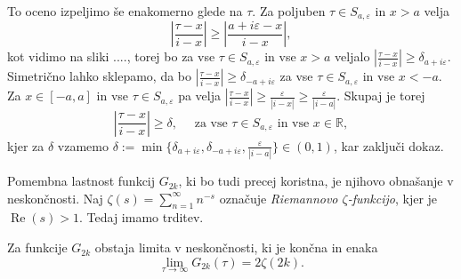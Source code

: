 \documentclass[mat1]{fmfdelo}
\numberwithin{equation}{section}
\newcommand{\R}{\mathbb R}
\newcommand{\abs}[1]{\left\lvert #1 \right\rvert}
\renewcommand\Re{\operatorname{Re}}%
\theoremstyle{definition}
\begin{document}
\begin{dokaz}
    To oceno izpeljimo še enakomerno glede na $\tau$. Za poljuben $\tau \in S_{a, \varepsilon}$ in $x > a$ velja 
    \[
        \abs{\frac{\tau - x}{i - x}} \geq \abs{\frac{a + i\varepsilon - x}{i - x}},
    \]
    kot vidimo na sliki ...., torej bo za vse $\tau \in S_{a, \varepsilon}$ in vse $x > a$
    veljalo $\abs{\tfrac{\tau - x}{i - x}} \geq \delta_{a+i\varepsilon}$. Simetrično lahko sklepamo, da bo $\abs{\tfrac{\tau - x}{i - x}} \geq \delta_{-a+i\varepsilon}$ za vse $\tau \in S_{a, \varepsilon}$ in vse $x < -a$. Za $x \in [-a,a]$ in vse $\tau \in S_{a, \varepsilon}$ pa velja $\abs{\frac{\tau - x}{i - x}} \geq \frac{\varepsilon}{\abs{i - x}} \geq \frac{\varepsilon}{\abs{i - a}}$.
    Skupaj je torej 
    \[
        \abs{\frac{\tau - x}{i - x}} \geq \delta, \quad \text{ za vse } \tau \in S_{a, \varepsilon} \text{ in vse } x \in \R,
    \]
    kjer za $\delta$ vzamemo $\delta := \min\{\delta_{a + i\varepsilon}, \delta_{-a + i\varepsilon}, \frac{\varepsilon}{\abs{i - a}}\} \in (0,1)$, kar zaključi dokaz. \qedhere 
    
\end{dokaz}



Pomembna lastnost funkcij $G_{2k}$, ki bo tudi precej koristna, je njihovo obnašanje v neskončnosti. Naj $\zeta(s) = \sum_{n = 1}^\infty n^{-s}$ označuje \emph{Riemannovo $\zeta$-funkcijo}, kjer je $\Re(s) > 1$. Tedaj imamo trditev.

\begin{trditev}
    \label{G2k v neskoncnosti}
    Za funkcije $G_{2k}$ obstaja limita v neskončnosti, ki je končna in enaka 
    \[
        \lim_{\tau \to \infty}G_{2k}(\tau) = 2\zeta(2k).  
    \]
\end{trditev}
\end{document}
